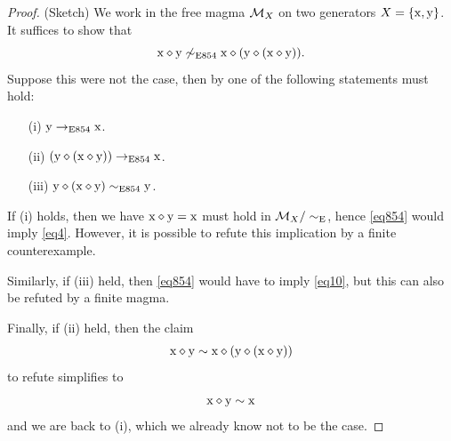 \begin{proof}(Sketch)
  We work in the free magma ${\mathcal{M}}_X$ on two generators $X = \{\mathrm{x},\mathrm{y}\}$.  It suffices to show that
$$  \mathrm{x} \diamond \mathrm{y} \not \sim_{\mathrm{E}854} \mathrm{x} \diamond (\mathrm{y} \diamond (\mathrm{x} \diamond \mathrm{y})).$$
Suppose this were not the case, then by  one of the following statements must hold:
\begin{itemize}
\item[(i)] $\mathrm{y} \to_{\mathrm{E}854} \mathrm{x}$.
\item[(ii)] $(\mathrm{y} \diamond (\mathrm{x} \diamond \mathrm{y})) \to_{\mathrm{E}854} \mathrm{x}$.
\item[(iii)] $\mathrm{y} \diamond (\mathrm{x} \diamond \mathrm{y}) \sim_{\mathrm{E}854} \mathrm{y}$.
\end{itemize}
If (i) holds, then we have $\mathrm{x} \diamond \mathrm{y} = \mathrm{x}$ must hold in ${\mathcal{M}}_X/\sim_{\mathrm{E}}$, hence \eqref{eq854} would imply \eqref{eq4}.  However, it is possible to refute this implication by a finite counterexample.

Similarly, if (iii) held, then \eqref{eq854} would have to imply \eqref{eq10}, but this can also be refuted by a finite magma.

Finally, if (ii) held, then the claim
$$  \mathrm{x} \diamond \mathrm{y} \sim \mathrm{x} \diamond (\mathrm{y} \diamond (\mathrm{x} \diamond \mathrm{y}))$$
to refute simplifies to
$$  \mathrm{x} \diamond \mathrm{y} \sim \mathrm{x}$$
and we are back to (i), which we already know not to be the case.
\end{proof}
